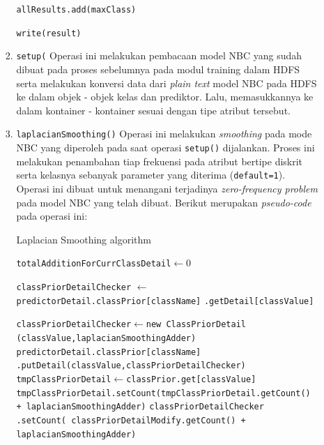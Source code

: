 \begin{enumerate}
\begin{itemize}
\begin{enumerate}
\begin{algorithm}[H]
\begin{algorithmic}[1]
				\State \texttt{allResults.add(maxClass)}
				
			\EndFor
			
				\State \texttt{write(result)}
			\EndFor

			\EndProcedure
			\end{algorithmic}
			\end{algorithm}
			
			\item{\texttt{setup(}}
			Operasi ini melakukan pembacaan model NBC yang sudah dibuat pada proses sebelumnya pada modul training dalam HDFS serta melakukan konversi data dari \textit{plain text} model NBC pada HDFS ke dalam objek - objek kelas dan prediktor. Lalu, memasukkannya ke dalam kontainer - kontainer sesuai dengan tipe atribut tersebut.

			
			\item{\texttt{laplacianSmoothing()}}
			Operasi ini melakukan \textit{smoothing} pada mode NBC yang diperoleh pada saat operasi \texttt{setup()} dijalankan. Proses ini melakukan penambahan tiap frekuensi pada atribut bertipe diskrit serta kelasnya sebanyak parameter yang diterima (\texttt{default=1}). Operasi ini dibuat untuk menangani terjadinya \textit{zero-frequency problem} pada model NBC yang telah dibuat. Berikut merupakan \textit{pseudo-code} pada operasi ini:
			\begin{algorithm}[H]
			\caption{Laplacian Smoothing algorithm}\label{alg:NBCTestLaplace}
			\begin{algorithmic}[1]


				
					
						\State \texttt{totalAdditionForCurrClassDetail}$ \gets 0$
						
							\State \texttt{classPriorDetailChecker} $\gets$ \texttt{predictorDetail.classPrior[className]} \texttt{.getDetail[classValue]}
														
								\State \texttt{classPriorDetailChecker}$ \gets $\texttt{new ClassPriorDetail} \texttt{(classValue,laplacianSmoothingAdder)}
								\State \texttt{predictorDetail.classPrior[className]} \texttt{.putDetail(classValue,classPriorDetailChecker)}
								\State \texttt{tmpClassPriorDetail}$ \gets $\texttt{classPrior.get[classValue]}
								\State \texttt{tmpClassPriorDetail.setCount(tmpClassPriorDetail.getCount() + laplacianSmoothingAdder)}		
							\Else
								\State \texttt{classPriorDetailChecker .setCount( classPriorDetailModify.getCount() + laplacianSmoothingAdder)}
							\EndIf
							

\end{algorithmic}
\end{algorithm}
\end{enumerate}
\end{itemize}
\end{enumerate}
